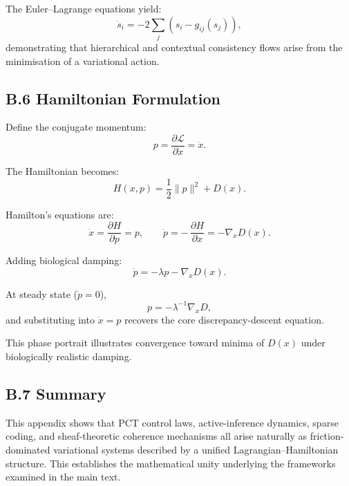 \documentclass[11pt,a4paper,twoside]{article}
\begin{document}
The Euler--Lagrange equations yield:
\[
\dot{s}_i = -2 \sum_j \left( s_i - g_{ij}(s_j) \right),
\]
demonstrating that hierarchical and contextual consistency flows arise from the minimisation of a variational action.

\subsection*{B.6 Hamiltonian Formulation}

Define the conjugate momentum:
\[
p = \frac{\partial \mathcal{L}}{\partial \dot{x}} = \dot{x}.
\]

The Hamiltonian becomes:
\[
H(x,p) = \frac{1}{2}\|p\|^2 + D(x).
\]

Hamilton's equations are:
\[
\dot{x} = \frac{\partial H}{\partial p} = p,
\qquad
\dot{p} = -\,\frac{\partial H}{\partial x} = -\nabla_x D(x).
\]

Adding biological damping:
\[
\dot{p} = -\lambda p - \nabla_x D(x).
\]

At steady state ($\dot{p}=0$), 
\[
p = -\lambda^{-1}\nabla_x D,
\]
and substituting into $\dot{x} = p$ recovers the core discrepancy-descent equation.

\begin{center}
\end{center}

This phase portrait illustrates convergence toward minima of $D(x)$ under biologically realistic damping.

\subsection*{B.7 Summary}

This appendix shows that PCT control laws, active-inference dynamics, sparse coding, and sheaf-theoretic coherence mechanisms all arise naturally as friction-dominated variational systems described by a unified Lagrangian--Hamiltonian structure. This establishes the mathematical unity underlying the frameworks examined in the main text.
\end{document}
